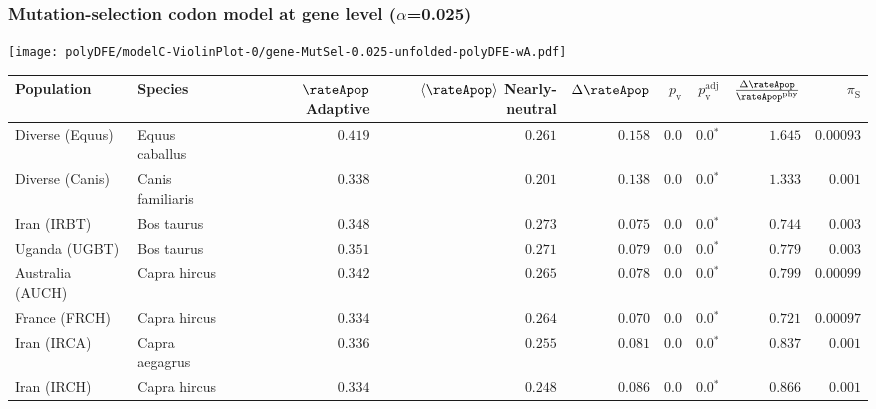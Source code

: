\subsubsection*{Mutation-selection codon model at gene level ($\alpha$=0.025)}
\begin{center}
    \texttt{[image: polyDFE/modelC-ViolinPlot-0/gene-MutSel-0.025-unfolded-polyDFE-wA.pdf]}
    \begin{adjustbox}{width = 1\textwidth}
        \begin{tabular}{|l|l|r|r|r|r|r|r|r|}
            \toprule
            Population & Species & \specialcell{$\rateApop$ \\ Adaptive}                & \specialcell{$\left< \rateApop \right>$ \\ Nearly-neutral}                & $\Delta \rateApop $    & $p_{\mathrm{v}}$ & $p_{\mathrm{v}}^{\mathrm{adj}}$ & $\frac{\Delta\rateApop}{\rateApop^{\mathrm{phy}}}$ & $\pi_{\textrm{S}}$ \\
            \midrule
            Diverse (Equus)                    & Equus caballus          & $ 0.419$ & $ 0.261$ & $ 0.158$ & $0.0$ & $\bm{0.0{^*}}$ & $ 1.645$ & $0.00093$  \\
            Diverse (Canis)                  & Canis familiaris          & $ 0.338$ & $ 0.201$ & $ 0.138$ & $0.0$ & $\bm{0.0{^*}}$ & $ 1.333$ & $ 0.001$ \\
            Iran (IRBT)               & Bos taurus        & $ 0.348$ & $ 0.273$ & $ 0.075$ & $0.0$ & $\bm{0.0{^*}}$ & $ 0.744$ & $ 0.003$ \\
            Uganda (UGBT)                  & Bos taurus        & $ 0.351$ & $ 0.271$ & $ 0.079$ & $0.0$ & $\bm{0.0{^*}}$ & $ 0.779$ & $ 0.003$ \\
            Australia (AUCH)                    & Capra hircus      & $ 0.342$ & $ 0.265$ & $ 0.078$ & $0.0$ & $\bm{0.0{^*}}$ & $ 0.799$ & $0.00099$ \\
            France (FRCH)                    & Capra hircus        & $ 0.334$ & $ 0.264$ & $ 0.070$ & $0.0$ & $\bm{0.0{^*}}$ & $ 0.721$ & $0.00097$ \\
            Iran (IRCA)                   & Capra aegagrus        & $ 0.336$ & $ 0.255$ & $ 0.081$ & $0.0$ & $\bm{0.0{^*}}$ & $ 0.837$ & $ 0.001$ \\
            Iran (IRCH)                 & Capra hircus        & $ 0.334$ & $ 0.248$ & $ 0.086$ & $0.0$ & $\bm{0.0{^*}}$ & $ 0.866$ & $ 0.001$ \\

\end{tabular}
\end{adjustbox}
\end{center}
